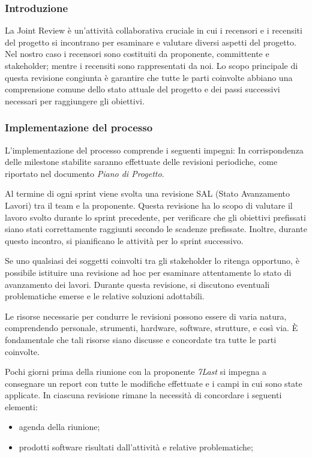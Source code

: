 \subsubsection{Introduzione}
La Joint Review è un'attività collaborativa cruciale in cui i recensori e i recensiti del progetto si incontrano per esaminare e valutare diversi aspetti del progetto.  Nel nostro caso i recensori sono costituiti da proponente, committente e stakeholder; mentre i recensiti sono rappresentati da noi. Lo scopo principale di questa revisione congiunta è garantire che tutte le parti coinvolte abbiano una comprensione comune dello stato attuale del progetto e dei passi successivi necessari per raggiungere gli obiettivi.

\subsubsection{Implementazione del processo}
L'implementazione del processo comprende i seguenti impegni:
In corrispondenza delle milestone stabilite saranno effettuate delle revisioni periodiche, come riportato nel
documento \textit{Piano di Progetto}.

Al termine di ogni sprint viene svolta una revisione SAL
(Stato Avanzamento Lavori) tra il team e la proponente. Questa revisione ha lo scopo di valutare il lavoro svolto durante lo sprint precedente, per verificare che gli obiettivi prefissati siano stati correttamente raggiunti secondo le scadenze prefissate.
Inoltre, durante questo incontro, si pianificano le attività per lo sprint successivo.

Se uno qualsiasi dei soggetti coinvolti tra gli stakeholder lo ritenga opportuno, è possibile istituire una revisione ad hoc per esaminare attentamente lo stato di avanzamento dei lavori. Durante questa revisione, si discutono eventuali problematiche emerse e le relative soluzioni adottabili.

Le risorse necessarie per condurre le revisioni possono essere di varia natura, comprendendo personale, strumenti, hardware, software, strutture, e così via. È fondamentale che tali risorse siano discusse e concordate tra tutte le parti coinvolte.

Pochi giorni prima della riunione con la proponente \textit{7Last} si impegna a consegnare un report con tutte le modifiche effettuate e i campi in cui sono state applicate.
In ciascuna revisione rimane la necessità di concordare i seguenti elementi:
\begin{itemize}
	\item agenda della riunione;
	\item prodotti software risultati dall'attività e relative problematiche;
\end{itemize}

